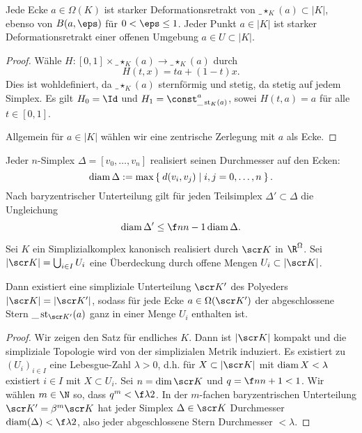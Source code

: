 \begin{st}
	Jede Ecke $a \in \Omega(K)$ ist starker Deformationsretrakt von $\_\star_K(a) \subset |K|$, ebenso von $B(a, \eps)$ für $0 < \eps \le 1$.
	Jeder Punkt $a \in |K|$ ist starker Deformationsretrakt einer offenen Umgebung $a \in U \subset |K|$.
	\begin{proof}
		Wähle $H: [0,1] \times \_\star_K(a) \to \_\star_K(a)$ durch
		\[
			H(t, x) = ta + (1-t) x.
		\]
		Dies ist wohldefiniert, da $\_\star_K(a)$ sternförmig und stetig, da stetig auf jedem Simplex.
		Es gilt $H_0 = \Id$ und $H_1 = \const_{\_\star_K(a)}^a$, sowei $H(t,a) = a$ für alle $t \in [0,1]$.

		Allgemein für $a \in |K|$ wählen wir eine zentrische Zerlegung mit $a$ als Ecke.
	\end{proof}
\end{st}

\begin{lem}
	Jeder $n$-Simplex $\Delta = [v_0, \dotsc, v_n]$ realisiert seinen Durchmesser auf den Ecken:
	\[
		\operatorname{diam} \Delta := \max \Set{ d(v_i, v_j) | i,j = 0, \dotsc, n }.
	\]
	Nach baryzentrischer Unterteilung gilt für jeden Teilsimplex $\Delta' \subset \Delta$ die Ungleichung
	\[
		\diam \Delta' \le \f n{n-1} \diam \Delta.
	\]
\end{lem}

\begin{st}
	Sei $K$ ein Simplizialkomplex kanonisch realisiert durch $\scr K$ in $\R^\Omega$.
	Sei $|\scr K| = \bigcup_{i\in I} U_i$ eine Überdeckung durch offene Mengen $U_i \subset |\scr K|$.

	Dann existiert eine simpliziale Unterteilung $\scr K'$ des Polyeders $|\scr K| = |\scr K'|$, sodass für jede Ecke $a \in \Omega(\scr K')$ der abgeschlossene Stern $\_\star_{\scr K'}(a)$ ganz in einer Menge $U_i$ enthalten ist.
	\begin{proof}
		Wir zeigen den Satz für endliches $K$.
		Dann ist $|\scr K|$ kompakt und die simpliziale Topologie wird von der simplizialen Metrik induziert.
		Es existiert zu $(U_i)_{i\in I}$ eine Lebesgue-Zahl $\lambda > 0$, d.h. für $X \subset |\scr K|$ mit $\operatorname{diam} X < \lambda$ existiert $i \in I$ mit $X \subset U_i$.
		Sei $n = \dim \scr K$ und $q = \f n{n+1} < 1$.
		Wir wählen $m \in \N$ so, dass $q^m < \f \lambda 2$.
		In der $m$-fachen baryzentrischen Unterteilung $\scr K' = \beta^m \scr K$ hat jeder Simplex $\Delta \in \scr K$ Durchmesser $\diam(\Delta) < \f \lambda 2$, also jeder abgeschlossene Stern Durchmesser $< \lambda$.
	\end{proof}
\end{st}

